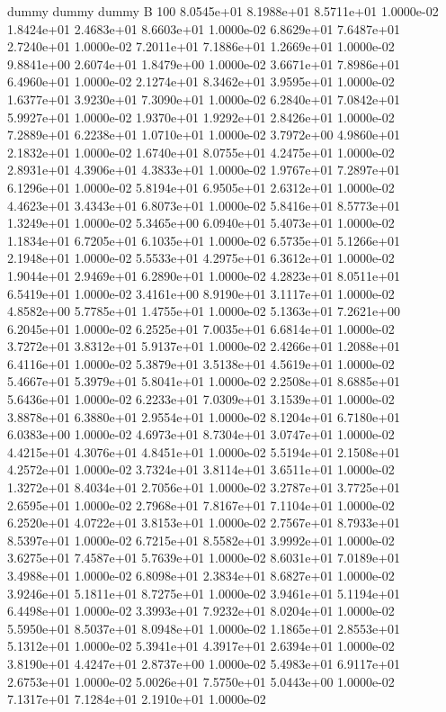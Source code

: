 dummy
dummy
dummy
B 100
8.0545e+01 8.1988e+01 8.5711e+01 1.0000e-02
1.8424e+01 2.4683e+01 8.6603e+01 1.0000e-02
6.8629e+01 7.6487e+01 2.7240e+01 1.0000e-02
7.2011e+01 7.1886e+01 1.2669e+01 1.0000e-02
9.8841e+00 2.6074e+01 1.8479e+00 1.0000e-02
3.6671e+01 7.8986e+01 6.4960e+01 1.0000e-02
2.1274e+01 8.3462e+01 3.9595e+01 1.0000e-02
1.6377e+01 3.9230e+01 7.3090e+01 1.0000e-02
6.2840e+01 7.0842e+01 5.9927e+01 1.0000e-02
1.9370e+01 1.9292e+01 2.8426e+01 1.0000e-02
7.2889e+01 6.2238e+01 1.0710e+01 1.0000e-02
3.7972e+00 4.9860e+01 2.1832e+01 1.0000e-02
1.6740e+01 8.0755e+01 4.2475e+01 1.0000e-02
2.8931e+01 4.3906e+01 4.3833e+01 1.0000e-02
1.9767e+01 7.2897e+01 6.1296e+01 1.0000e-02
5.8194e+01 6.9505e+01 2.6312e+01 1.0000e-02
4.4623e+01 3.4343e+01 6.8073e+01 1.0000e-02
5.8416e+01 8.5773e+01 1.3249e+01 1.0000e-02
5.3465e+00 6.0940e+01 5.4073e+01 1.0000e-02
1.1834e+01 6.7205e+01 6.1035e+01 1.0000e-02
6.5735e+01 5.1266e+01 2.1948e+01 1.0000e-02
5.5533e+01 4.2975e+01 6.3612e+01 1.0000e-02
1.9044e+01 2.9469e+01 6.2890e+01 1.0000e-02
4.2823e+01 8.0511e+01 6.5419e+01 1.0000e-02
3.4161e+00 8.9190e+01 3.1117e+01 1.0000e-02
4.8582e+00 5.7785e+01 1.4755e+01 1.0000e-02
5.1363e+01 7.2621e+00 6.2045e+01 1.0000e-02
6.2525e+01 7.0035e+01 6.6814e+01 1.0000e-02
3.7272e+01 3.8312e+01 5.9137e+01 1.0000e-02
2.4266e+01 1.2088e+01 6.4116e+01 1.0000e-02
5.3879e+01 3.5138e+01 4.5619e+01 1.0000e-02
5.4667e+01 5.3979e+01 5.8041e+01 1.0000e-02
2.2508e+01 8.6885e+01 5.6436e+01 1.0000e-02
6.2233e+01 7.0309e+01 3.1539e+01 1.0000e-02
3.8878e+01 6.3880e+01 2.9554e+01 1.0000e-02
8.1204e+01 6.7180e+01 6.0383e+00 1.0000e-02
4.6973e+01 8.7304e+01 3.0747e+01 1.0000e-02
4.4215e+01 4.3076e+01 4.8451e+01 1.0000e-02
5.5194e+01 2.1508e+01 4.2572e+01 1.0000e-02
3.7324e+01 3.8114e+01 3.6511e+01 1.0000e-02
1.3272e+01 8.4034e+01 2.7056e+01 1.0000e-02
3.2787e+01 3.7725e+01 2.6595e+01 1.0000e-02
2.7968e+01 7.8167e+01 7.1104e+01 1.0000e-02
6.2520e+01 4.0722e+01 3.8153e+01 1.0000e-02
2.7567e+01 8.7933e+01 8.5397e+01 1.0000e-02
6.7215e+01 8.5582e+01 3.9992e+01 1.0000e-02
3.6275e+01 7.4587e+01 5.7639e+01 1.0000e-02
8.6031e+01 7.0189e+01 3.4988e+01 1.0000e-02
6.8098e+01 2.3834e+01 8.6827e+01 1.0000e-02
3.9246e+01 5.1811e+01 8.7275e+01 1.0000e-02
3.9461e+01 5.1194e+01 6.4498e+01 1.0000e-02
3.3993e+01 7.9232e+01 8.0204e+01 1.0000e-02
5.5950e+01 8.5037e+01 8.0948e+01 1.0000e-02
1.1865e+01 2.8553e+01 5.1312e+01 1.0000e-02
5.3941e+01 4.3917e+01 2.6394e+01 1.0000e-02
3.8190e+01 4.4247e+01 2.8737e+00 1.0000e-02
5.4983e+01 6.9117e+01 2.6753e+01 1.0000e-02
5.0026e+01 7.5750e+01 5.0443e+00 1.0000e-02
7.1317e+01 7.1284e+01 2.1910e+01 1.0000e-02
